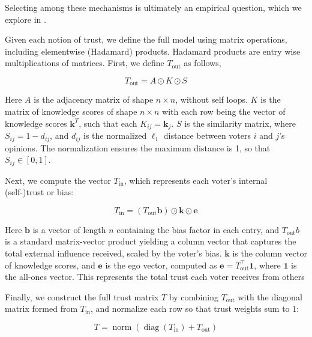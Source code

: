 Selecting among these mechanisms is ultimately an empirical question, which we explore in .

Given each notion of trust, we define the full model using matrix operations,
including elementwise (Hadamard) products. Hadamard products are entry wise
multiplications of matrices. First, we define $T_{\text{out}}$ as follows,

\begin{equation}
	T_{\text{out}} = A \odot  K \odot S
	\label{eq:mat_out_trust}
\end{equation}

Here $A$ is the adjacency matrix of shape $n \times n$, without self loops. $K$
is the matrix of knowledge scores of shape $n \times n$ with each row being
the vector of knowledge scores $\boldsymbol{k}^T$, such that each $K_{ij} =
	\boldsymbol{k}_j$. $S$ is the similarity matrix, where $S_{ij} = 1 - d_{ij}$,
and $d_{ij}$ is the normalized $\ell_1$ distance between voters $i$ and $j$’s
opinions. The normalization ensures the maximum distance is 1, so that $S_{ij}
	\in [0, 1]$.

Next, we compute the vector $T_{\text{in}}$, which represents each voter’s internal (self-)trust or bias:

\begin{equation}
	T_{\text{in}} = (T_{\text{out}} \boldsymbol{b}) \odot \boldsymbol{k} \odot \boldsymbol{e}
	\label{eq:in_trust}
\end{equation}

Here $\boldsymbol{b}$ is a vector of length $n$ containing the bias factor in each entry,
and $T_{\text{out}} b$ is a standard matrix-vector product yielding a column
vector that captures the total external influence received, scaled by the
voter's bias. $\boldsymbol{k}$ is the column vector of knowledge scores, and
$\boldsymbol{e}$ is the ego vector, computed as $\boldsymbol{e} = T_{\text{out}}^\top
	\boldsymbol{1}$, where $\boldsymbol{1}$ is the all-ones vector. This represents
the total trust each voter receives from others


Finally, we construct the full trust matrix $T$ by combining $T_{\text{out}}$ with the diagonal matrix formed from $T_{\text{in}}$, and normalize each row so that trust weights sum to 1:


\begin{equation}
	T = \operatorname{norm}\left(\operatorname{diag}(T_{\text{in}}) + T_{\text{out}}\right)
	\label{eq:final_trust}
\end{equation}

